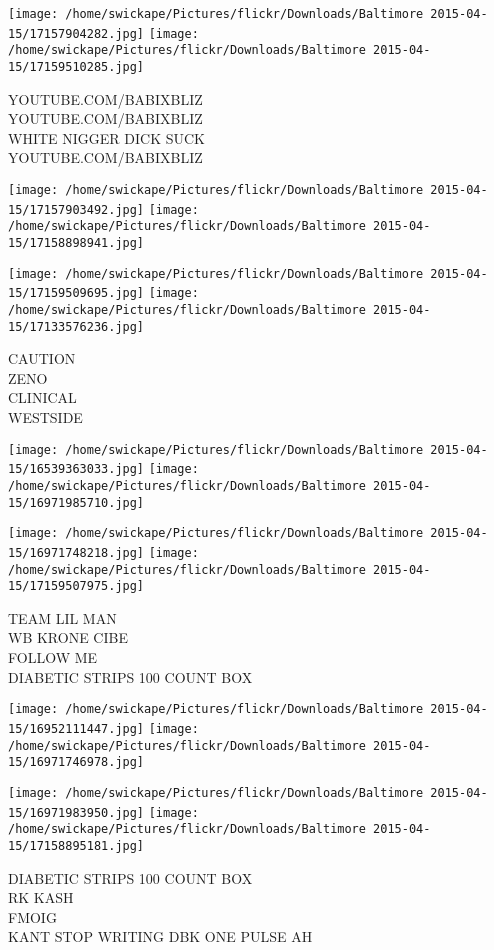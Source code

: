 \documentclass[10pt,letterpaper]{article}
\begin{document}
\texttt{[image: /home/swickape/Pictures/flickr/Downloads/Baltimore 2015-04-15/17157904282.jpg]}
\texttt{[image: /home/swickape/Pictures/flickr/Downloads/Baltimore 2015-04-15/17159510285.jpg]}

YOUTUBE.COM/BABIXBLIZ\\
YOUTUBE.COM/BABIXBLIZ\\
WHITE NIGGER DICK SUCK\\
YOUTUBE.COM/BABIXBLIZ
\pagebreak

\texttt{[image: /home/swickape/Pictures/flickr/Downloads/Baltimore 2015-04-15/17157903492.jpg]}
\texttt{[image: /home/swickape/Pictures/flickr/Downloads/Baltimore 2015-04-15/17158898941.jpg]}

\texttt{[image: /home/swickape/Pictures/flickr/Downloads/Baltimore 2015-04-15/17159509695.jpg]}
\texttt{[image: /home/swickape/Pictures/flickr/Downloads/Baltimore 2015-04-15/17133576236.jpg]}

CAUTION\\
ZENO\\
CLINICAL\\
WESTSIDE
\pagebreak

\texttt{[image: /home/swickape/Pictures/flickr/Downloads/Baltimore 2015-04-15/16539363033.jpg]}
\texttt{[image: /home/swickape/Pictures/flickr/Downloads/Baltimore 2015-04-15/16971985710.jpg]}

\texttt{[image: /home/swickape/Pictures/flickr/Downloads/Baltimore 2015-04-15/16971748218.jpg]}
\texttt{[image: /home/swickape/Pictures/flickr/Downloads/Baltimore 2015-04-15/17159507975.jpg]}

TEAM LIL MAN\\
WB KRONE CIBE\\
FOLLOW ME\\
DIABETIC STRIPS 100 COUNT BOX
\pagebreak

\texttt{[image: /home/swickape/Pictures/flickr/Downloads/Baltimore 2015-04-15/16952111447.jpg]}
\texttt{[image: /home/swickape/Pictures/flickr/Downloads/Baltimore 2015-04-15/16971746978.jpg]}

\texttt{[image: /home/swickape/Pictures/flickr/Downloads/Baltimore 2015-04-15/16971983950.jpg]}
\texttt{[image: /home/swickape/Pictures/flickr/Downloads/Baltimore 2015-04-15/17158895181.jpg]}

DIABETIC STRIPS 100 COUNT BOX\\
RK KASH\\
FMOIG\\
KANT STOP WRITING DBK ONE PULSE AH
\pagebreak
\end{document}
